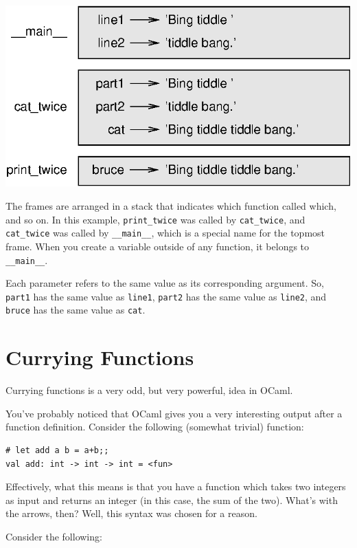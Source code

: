\documentclass[10pt]{book}
\begin{document}
\beforefig
\centerline{\includegraphics{figs/stack.eps}}
\afterfig

The frames are arranged in a stack that indicates which function
called which, and so on.  In this example, \verb"print_twice"
was called by \verb"cat_twice", and \verb"cat_twice" was called by 
\verb"__main__", which is a special name for the topmost frame.  When
you create a variable outside of any function, it belongs to 
\verb"__main__".

Each parameter refers to the same value as its corresponding
argument.  So, {\tt part1} has the same value as
{\tt line1}, {\tt part2} has the same value as {\tt line2},
and {\tt bruce} has the same value as {\tt cat}.

\section{Currying Functions}


Currying functions is a very odd, but very powerful, idea in OCaml.

You've probably noticed that OCaml gives you a very interesting output
after a function definition. Consider the following (somewhat trivial) function:

\beforeverb
\begin{verbatim}
# let add a b = a+b;;
val add: int -> int -> int = <fun>
\end{verbatim}
\afterverb

Effectively, what this means is that you have a function which takes two 
integers as input and returns an integer (in this case, the sum of the two). 
What's with the arrows, then? Well, this syntax was chosen for a reason.

Consider the following:
\end{document}

